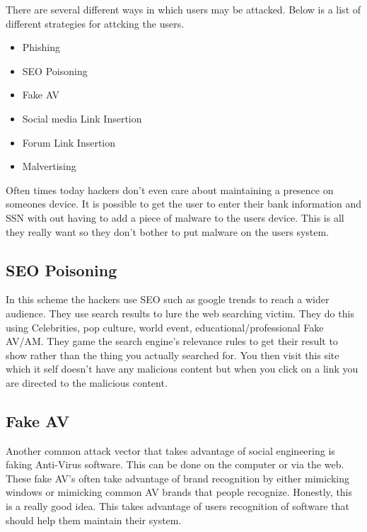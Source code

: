 \documentclass[letterpaper, onecolumn,10pt]{IEEEtran}
\begin{document}
                There are several different ways in which users may be attacked. Below is a list of different strategies for attcking the users.
                
                \begin{itemize}
                    \item Phishing
                    \item SEO Poisoning
                    \item Fake AV
                    \item Social media Link Insertion
                    \item Forum Link Insertion
                    \item Malvertising
                \end{itemize}
                Often times today hackers don't even care about maintaining a presence on someones device. It is possible to get the user to enter their bank information and SSN with out having to add a piece of malware to the users device. This is all they really want so they don't bother to put malware on the users system.\\
                
                \subsection{SEO Poisoning}
                In this scheme the hackers use SEO such as google trends to reach a wider audience. They use search results to lure the web searching victim. They do this using Celebrities, pop culture, world event, educational/professional Fake AV/AM. They game the search engine's relevance rules to get their result to show rather than the thing you actually searched for. You then visit this site which it self doesn't have any malicious content but when you click on a link you are directed to the malicious content.\\
                
                \subsection{Fake AV}
                Another common attack vector that takes advantage of social engineering is faking Anti-Virus software. This can be done on the computer or via the web. These fake AV's often take advantage of brand recognition by either mimicking windows or mimicking common AV brands that people recognize. Honestly, this is a really good idea. This takes advantage of users recognition of software that should help them maintain their system.\\
                
\end{document}
